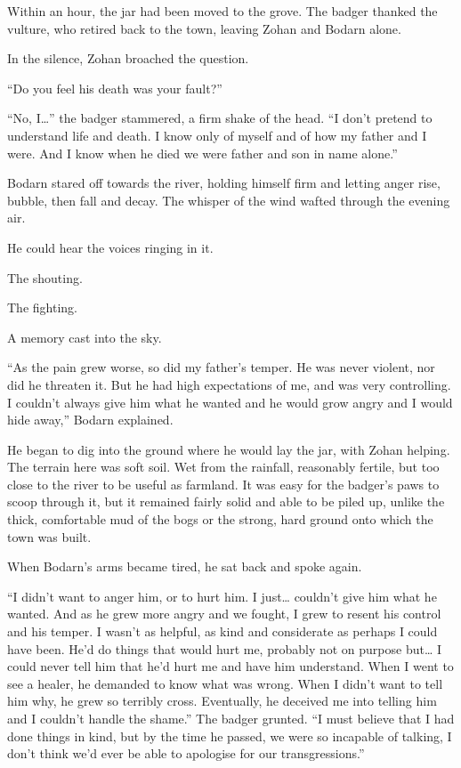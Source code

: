 \secdiv

\noindent Within an hour, the jar had been moved to the grove. The badger thanked the vulture, who retired back to the town, leaving Zohan and Bodarn alone.

In the silence, Zohan broached the question.

``Do you feel his death was your fault?''

``No, I\ldots'' the badger stammered, a firm shake of the head. ``I don't pretend to understand life and death. I know only of myself and of how my father and I were. And I know when he died we were father and son in name alone.''

Bodarn stared off towards the river, holding himself firm and letting anger rise, bubble, then fall and decay. The whisper of the wind wafted through the evening air.

He could hear the voices ringing in it.

The shouting.

The fighting.

A memory cast into the sky.

``As the pain grew worse, so did my father's temper. He was never violent, nor did he threaten it. But he had high expectations of me, and was very controlling. I couldn't always give him what he wanted and he would grow angry and I would hide away,'' Bodarn explained.

He began to dig into the ground where he would lay the jar, with Zohan helping. The terrain here was soft soil. Wet from the rainfall, reasonably fertile, but too close to the river to be useful as farmland. It was easy for the badger's paws to scoop through it, but it remained fairly solid and able to be piled up, unlike the thick, comfortable mud of the bogs or the strong, hard ground onto which the town was built.

When Bodarn's arms became tired, he sat back and spoke again.

``I didn't want to anger him, or to hurt him. I just\ldots{} couldn't give him what he wanted. And as he grew more angry and we fought, I grew to resent his control and his temper. I wasn't as helpful, as kind and considerate as perhaps I could have been. He'd do things that would hurt me, probably not on purpose but\ldots{} I could never tell him that he'd hurt me and have him understand. When I went to see a healer, he demanded to know what was wrong. When I didn't want to tell him why, he grew so terribly cross. Eventually, he deceived me into telling him and I couldn't handle the shame.'' The badger grunted. ``I must believe that I had done things in kind, but by the time he passed, we were so incapable of talking, I don't think we'd ever be able to apologise for our transgressions.''


